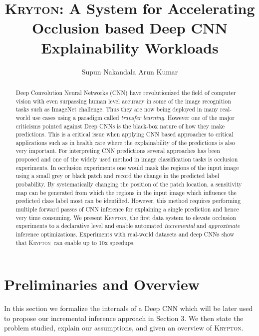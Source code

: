 \documentclass[10, sigconf]{acmart}
\newcommand{\system}{\textsc{Krypton}}
\begin{document}
\title{\textsc{Kryton}: A System for Accelerating Occlusion based Deep CNN Explainability Workloads}

\author{Supun Nakandala \hspace{7mm} Arun Kumar}


\begin{abstract}
Deep Convolution Neural Networks (CNN) have revolutionized the field of computer vision with even surpassing human level accuracy in some of the image recognition tasks such as ImageNet challenge. Thus they are now being deployed in many real-world use cases using a paradigm called \textit{transfer learning}. However one of the major criticisms pointed against Deep CNNs is the black-box nature of how they make predictions. This is a critical issue when applying CNN based approaches to critical applications such as in health care where the explainability of the predictions is also very important. For interpreting CNN predictions several approaches has been proposed and one of the widely used method in image classification tasks is occlusion experiments. In occlusion experiments one would mask the regions of the input image using a small grey or black patch and record the change in the predicted label probability. By systematically changing the position of the patch location, a sensitivity map can be generated from which the regions in the input image which influence the predicted class label most can be identified. However, this method requires performing multiple forward passes of CNN inference for explaining a single prediction and hence very time consuming.
We present \system, the first data system to elevate occlusion experiments to a declarative level and enable automated \textit{incremental} and \textit{approximate} inference optimizations. Experiments with real-world datasets and deep CNNs show that \system~can enable up to 10x speedups.
\end{abstract}

\maketitle





\section{Preliminaries and Overview}
In this section we formalize the internals of a Deep CNN which will be later used to propose our incremental inference approach in Section 3. We then state the problem studied, explain our assumptions, and given an overview of \system.
\end{document}

